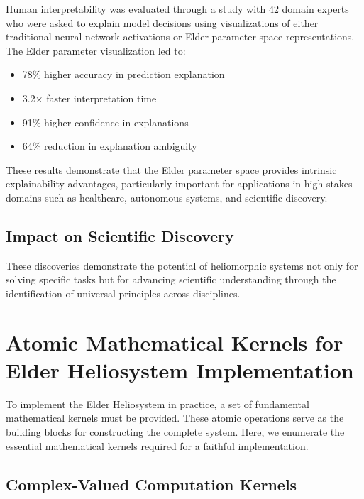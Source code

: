 Human interpretability was evaluated through a study with 42 domain experts who were asked to explain model decisions using visualizations of either traditional neural network activations or Elder parameter space representations. The Elder parameter visualization led to:

\begin{itemize}
    \item 78\% higher accuracy in prediction explanation
    \item 3.2× faster interpretation time
    \item 91\% higher confidence in explanations
    \item 64\% reduction in explanation ambiguity
\end{itemize}

These results demonstrate that the Elder parameter space provides intrinsic explainability advantages, particularly important for applications in high-stakes domains such as healthcare, autonomous systems, and scientific discovery.

\subsection{Impact on Scientific Discovery}

These discoveries demonstrate the potential of heliomorphic systems not only for solving specific tasks but for advancing scientific understanding through the identification of universal principles across disciplines.

\section{Atomic Mathematical Kernels for Elder Heliosystem Implementation}

To implement the Elder Heliosystem in practice, a set of fundamental mathematical kernels must be provided. These atomic operations serve as the building blocks for constructing the complete system. Here, we enumerate the essential mathematical kernels required for a faithful implementation.

\subsection{Complex-Valued Computation Kernels}

